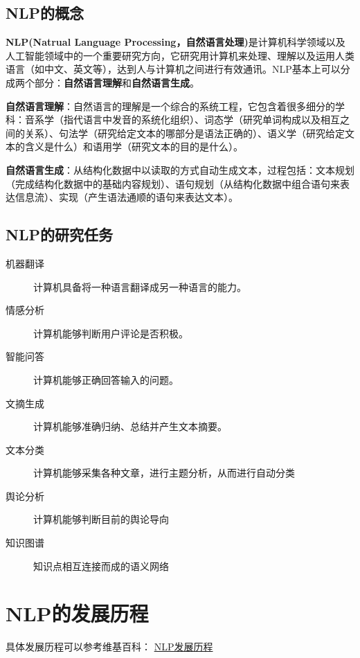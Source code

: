 \documentclass[UTF8]{ctexart}
\begin{document}
\subsection{NLP的概念}
\label{definitions}
\textbf{NLP(Natrual Language Processing，自然语言处理)}是计算机科学领域以及人工智能领域中的一个重要研究方向，它研究用计算机来处理、理解以及运用人类语言（如中文、英文等），达到人与计算机之间进行有效通讯。NLP基本上可以分成两个部分：\textbf{自然语言理解}和\textbf{自然语言生成}。
\begin{enumerate}
\begin{item}
	\textbf{自然语言理解}：自然语言的理解是一个综合的系统工程，它包含着很多细分的学科：音系学（指代语言中发音的系统化组织）、词态学（研究单词构成以及相互之间的关系）、句法学（研究给定文本的哪部分是语法正确的）、语义学（研究给定文本的含义是什么）和语用学（研究文本的目的是什么）。
\end{item}
\begin{item}
	\textbf{自然语言生成}：从结构化数据中以读取的方式自动生成文本，过程包括：文本规划（完成结构化数据中的基础内容规划）、语句规划（从结构化数据中组合语句来表达信息流）、实现（产生语法通顺的语句来表达文本）。
\end{item}
\end{enumerate}


\subsection{NLP的研究任务}
\label{definitions}
\begin{description}
	\item[机器翻译]
	计算机具备将一种语言翻译成另一种语言的能力。
	\item[情感分析]
	计算机能够判断用户评论是否积极。
	\item[智能问答]
	计算机能够正确回答输入的问题。
	\item[文摘生成]
	计算机能够准确归纳、总结并产生文本摘要。
	\item[文本分类]
	计算机能够采集各种文章，进行主题分析，从而进行自动分类
	\item[舆论分析]
	计算机能够判断目前的舆论导向
	\item[知识图谱]
	知识点相互连接而成的语义网络
\end{description}


\section{NLP的发展历程}
具体发展历程可以参考维基百科：
\href{https://zh.wikipedia.org/wiki/%E8%87%AA%E7%84%B6%E8%AF%AD%E8%A8%80%E5%A4%84%E7%90%86#%E6%AD%B7%E5%8F%B2}{NLP发展历程}
\end{document}
